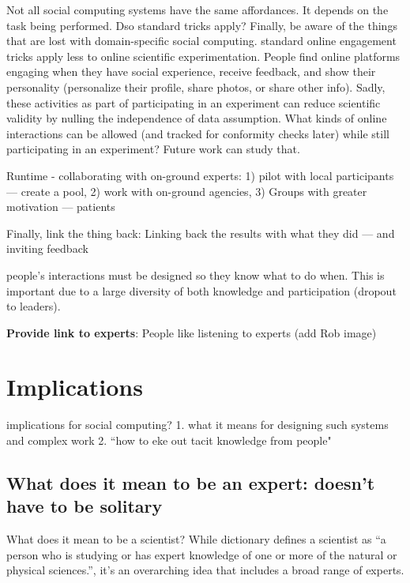 Not all social computing systems have the same affordances. It depends on the task being performed. Dso standard tricks apply? Finally, be aware of the things that are lost with domain-specific social computing. standard online engagement tricks apply less to online scientific experimentation. People find online platforms engaging when they have social experience, receive feedback, and show their personality (personalize their profile, share photos, or share other info). Sadly, these activities as part of participating in an experiment can reduce scientific validity by nulling the independence of data assumption. What kinds of online interactions can be allowed (and tracked for conformity checks later) while still participating in an experiment? Future work can study that.

Runtime - collaborating with on-ground experts: 1) pilot with local participants  — create a pool, 2) work with on-ground agencies, 3) Groups with greater motivation — patients


Finally, link the thing back: Linking back the results with what they did — and inviting feedback 

people’s interactions must be designed so they know what to do when. This is important due to a large diversity of both knowledge and participation  (dropout to leaders). 

\textbf{Provide link to experts}: People like listening to experts (add Rob image)







\section{Implications}

implications for social computing?
1. what it means for designing such systems and complex work
2. “how to eke out tacit knowledge from people"

\subsection{What does it mean to be an expert: doesn’t have to be solitary} 
What does it mean to be a scientist? While dictionary defines a scientist as “a person who is studying or has expert knowledge of one or more of the natural or physical sciences.”, it’s an overarching idea that includes a broad range of experts. 

